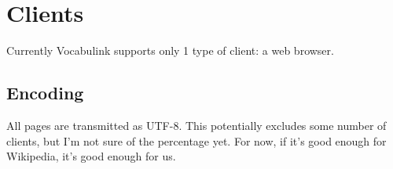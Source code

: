 \chapter{Clients}

Currently Vocabulink supports only 1 type of client: a web browser.

\section{Encoding}

All pages are transmitted as UTF-8. This potentially excludes some number of
clients, but I'm not sure of the percentage yet. For now, if it's good enough
for Wikipedia, it's good enough for us.
